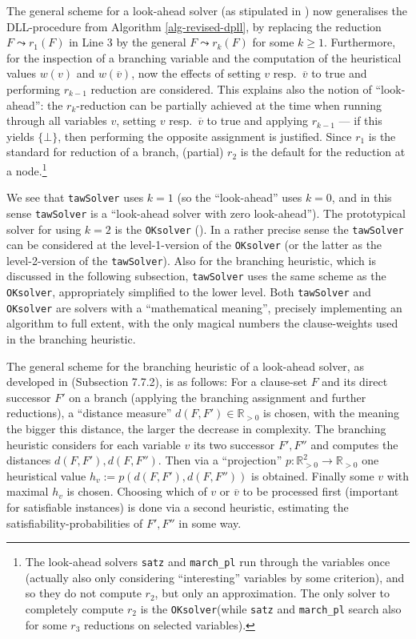 \documentclass[final,3p,times]{elsarticle}
\theoremstyle{definition}
\newcommand{\set}[1]{\{#1\}}
\newcommand{\ol}{\overline}
\newcommand{\RR}{\mathbb{R}}
\newcommand{\tawsolver}{\texttt{tawSolver}}
\newcommand{\oksolver}{\texttt{OKsolver}}
\newcommand{\satz}{\texttt{satz}}
\newcommand{\march}{\texttt{march\_pl}}
\begin{document}
The general scheme for a look-ahead solver (as stipulated in \cite{Kullmann2007HandbuchTau}) now generalises the DLL-procedure from Algorithm \ref{alg-revised-dpll}, by replacing the reduction $F \leadsto r_1(F)$ in Line 3 by the general $F \leadsto r_k(F)$ for some $k \ge 1$. Furthermore, for the inspection of a branching variable and the computation of the heuristical values $w(v)$ and $w(\ol{v})$, now the effects of setting $v$ resp.\ $\ol{v}$ to true and performing $r_{k-1}$ reduction are considered. This explains also the notion of ``look-ahead'': the $r_k$-reduction can be partially achieved at the time when running through all variables $v$, setting $v$ resp.\ $\ol{v}$ to true and applying $r_{k-1}$ --- if this yields $\set{\bot}$, then performing the opposite assignment is justified. Since $r_1$ is the standard for reduction of a branch, (partial) $r_2$ is the default for the reduction at a node.\footnote{The look-ahead solvers \satz{} and \march{} run through the variables once (actually also only considering ``interesting'' variables by some criterion), and so they do not compute $r_2$, but only an approximation. The only solver to completely compute $r_2$ is the \oksolver (while \satz{} and \march{} search also for some $r_3$ reductions on selected variables).}

We see that \tawsolver{} uses $k=1$ (so the ``look-ahead'' uses $k=0$, and in this sense \tawsolver{} is a ``look-ahead solver with zero look-ahead''). The prototypical solver for using $k=2$ is the \oksolver{} (\cite{Ku2002h}). In a rather precise sense the \tawsolver{} can be considered at the level-1-version of the \oksolver{} (or the latter as the level-2-version of the \tawsolver). Also for the branching heuristic, which is discussed in the following subsection, \tawsolver{} uses the same scheme as the \oksolver{}, appropriately simplified to the lower level. Both \tawsolver{} and \oksolver{} are solvers with a ``mathematical meaning'', precisely implementing an algorithm to full extent, with the only magical numbers the clause-weights used in the branching heuristic.

The general scheme for the branching heuristic of a look-ahead solver, as developed in \cite{Kullmann2007HandbuchTau} (Subsection 7.7.2), is as follows: For a clause-set $F$ and its direct successor $F'$ on a branch (applying the branching assignment and further reductions), a ``distance measure'' $d(F,F') \in \RR_{>0}$ is chosen, with the meaning the bigger this distance, the larger the decrease in complexity. The branching heuristic considers for each variable $v$ its two successor $F', F''$ and computes the distances $d(F,F'), d(F,F'')$. Then via a ``projection'' $p: \RR_{>0}^2 \rightarrow \RR_{>0}$ one heuristical value $h_v := p(d(F,F'), d(F,F''))$ is obtained. Finally some $v$ with maximal $h_v$ is chosen. Choosing which of $v$ or $\ol{v}$ to be processed first (important for satisfiable instances) is done via a second heuristic, estimating the satisfiability-probabilities of $F', F''$ in some way.
\end{document}
